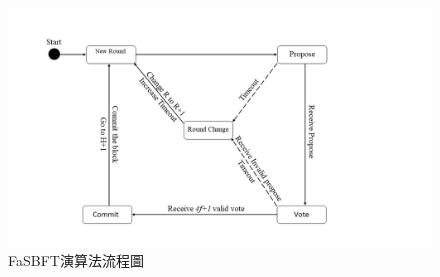 \begin{figure}[!htbp]
\centering
\includegraphics[scale=0.58]{images/2.jpg}
\caption{FaSBFT演算法流程圖}
\label{i:byz-latency}
\end{figure}